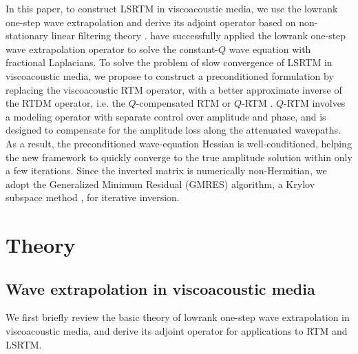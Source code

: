 In this paper, to construct LSRTM in viscoacoustic media, we use the lowrank one-step wave extrapolation \cite[]{me15b} and derive its adjoint operator based on non-stationary linear filtering theory \cite[]{margrave98}. \cite{me15a} have successfully applied the lowrank one-step wave extrapolation operator to solve the constant-$Q$ wave equation with fractional Laplacians. 
To solve the problem of slow convergence of LSRTM in viscoacoustic media, we propose to construct a preconditioned formulation by replacing the viscoacoustic RTM operator,  with a better approximate inverse of the RTDM operator, i.e. the $Q$-compensated RTM or $Q$-RTM \cite[]{zhang10,suh12,bai13,zhu14b}. $Q$-RTM involves a modeling operator with separate control over amplitude and phase, and is designed to compensate for the amplitude loss along the attenuated wavepaths. As a result, the preconditioned wave-equation Hessian is well-conditioned, helping the new framework to quickly converge to the true amplitude solution within only a few iterations. Since the inverted matrix is numerically non-Hermitian, we adopt the Generalized Minimum Residual (GMRES) algorithm, a Krylov subspace method \cite[]{saad1986gmres}, for iterative inversion. 

\section{Theory}

\subsection{Wave extrapolation in viscoacoustic media}
We first briefly review the basic theory of lowrank one-step wave extrapolation in visco\-acoustic media, and derive its adjoint operator for applications to RTM and LSRTM. 

